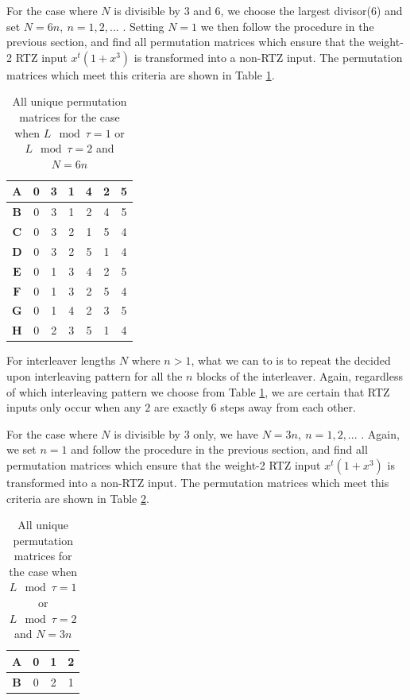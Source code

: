 \documentclass[11pt, oneside, dvipdfmx]{book}
\begin{document}
 For the case where $N$ is divisible by $3$ and $6$, we choose the largest divisor($6$) and set $N=6n,~n=1,2,...$ . Setting $N=1$ we then follow the procedure in the previous section, and find all permutation matrices which ensure that the weight-2 RTZ input $x^t(1+x^3)$ is transformed into a non-RTZ input. The permutation matrices which meet this criteria are shown in Table  \ref{tb2}. 
 \begin{table}[h!]
\centering
\begin{tabular}{|c || c  c  c  c  c  c|} 
 \hline
 $\mathbf{A}$ & 0 & 3 & 1 & 4 & 2 & 5\\ 
  \hline
  $\mathbf{B}$ & 0 & 3 & 1 & 2 & 4 & 5\\ 
  \hline
 $\mathbf{C}$ & 0 & 3 & 2 & 1 & 5 & 4\\ 
  \hline
  $\mathbf{D}$ & 0 & 3 & 2 & 5 & 1 & 4\\ 
 \hline
  $\mathbf{E}$ & 0 & 1 & 3 & 4 & 2 & 5\\ 
 \hline
 $\mathbf{F}$ & 0 & 1 & 3 & 2 & 5 & 4\\ 
 \hline
  $\mathbf{G}$ & 0 & 1 & 4 & 2 & 3 & 5\\ 
 \hline
 $\mathbf{H}$ & 0 & 2 & 3 & 5 & 1 & 4\\ 
 \hline
\end{tabular}
\caption{All unique permutation matrices for the case when $L \mod \tau =1$ or $L \mod \tau =2$ and $N=6n$}
\label{tb2}
\end{table}
 For interleaver lengths $N$ where $n>1$, what we can to is to repeat the decided upon interleaving pattern for all the $n$ blocks of the interleaver. Again, regardless of which interleaving pattern we choose from Table \ref{tb2}, we are certain that RTZ inputs only occur when any $2$ are exactly $6$ steps away from each other. 
 
 
 For the case where $N$ is divisible by $3$ only, we have $N=3n,~n=1,2,...$ . Again, we set $n=1$ and follow the procedure in the previous section, and find all permutation matrices which ensure that the weight-2 RTZ input $x^t(1+x^3)$ is transformed into a non-RTZ input. The permutation matrices which meet this criteria are shown in Table  \ref{tb3}. 
 
 \begin{table}[h!]
\centering
\begin{tabular}{|c || c  c  c|} 
 \hline
 $\mathbf{A}$ & 0 & 1 & 2\\ 
  \hline
  $\mathbf{B}$ & 0 & 2 & 1\\ 
  \hline
\end{tabular}
\caption{All unique permutation matrices for the case when $L \mod \tau =1$ or $L \mod \tau =2$ and $N=3n$}
\label{tb3}
\end{table}
\end{document}
